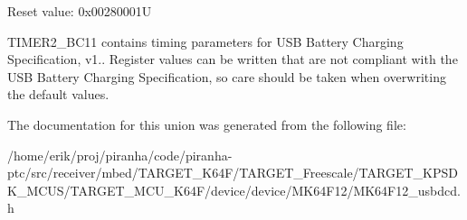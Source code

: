 Reset value\+: 0x00280001U

T\+I\+M\+E\+R2\+\_\+\+B\+C11 contains timing parameters for U\+SB Battery Charging Specification, v1.. Register values can be written that are not compliant with the U\+SB Battery Charging Specification, so care should be taken when overwriting the default values. 

The documentation for this union was generated from the following file\+:\begin{DoxyCompactItemize}
\item 
/home/erik/proj/piranha/code/piranha-\/ptc/src/receiver/mbed/\+T\+A\+R\+G\+E\+T\+\_\+\+K64\+F/\+T\+A\+R\+G\+E\+T\+\_\+\+Freescale/\+T\+A\+R\+G\+E\+T\+\_\+\+K\+P\+S\+D\+K\+\_\+\+M\+C\+U\+S/\+T\+A\+R\+G\+E\+T\+\_\+\+M\+C\+U\+\_\+\+K64\+F/device/device/\+M\+K64\+F12/M\+K64\+F12\+\_\+usbdcd.\+h\end{DoxyCompactItemize}
